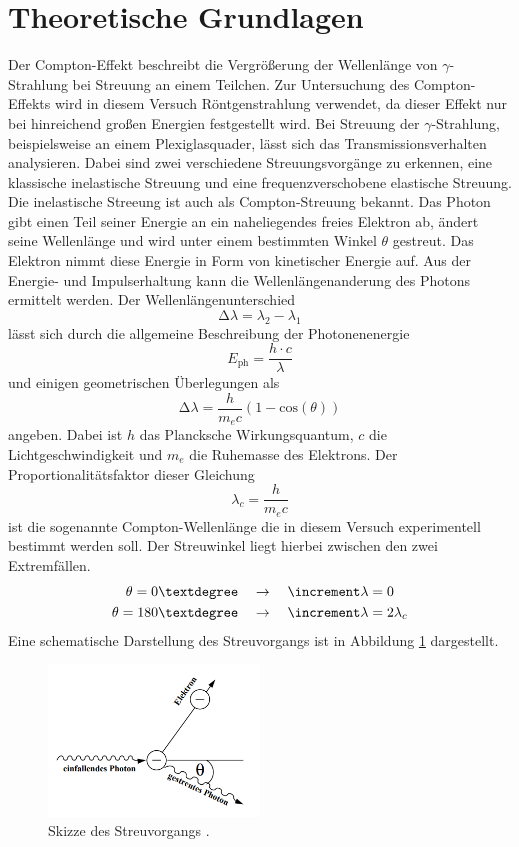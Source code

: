 \section{Theoretische Grundlagen}
Der Compton-Effekt beschreibt die Vergrößerung der Wellenlänge von $\gamma$-Strahlung bei Streuung an einem Teilchen. Zur Untersuchung
des Compton-Effekts wird in diesem Versuch Röntgenstrahlung verwendet, da dieser Effekt nur bei hinreichend großen Energien festgestellt wird.
Bei Streuung der $\gamma$-Strahlung, beispielsweise an einem Plexiglasquader, lässt sich das Transmissionsverhalten analysieren. Dabei
sind zwei verschiedene Streuungsvorgänge zu erkennen, eine klassische inelastische Streuung und eine frequenzverschobene elastische Streuung.
\\
Die inelastische Streeung ist auch als Compton-Streuung bekannt. Das Photon gibt einen Teil seiner Energie an ein naheliegendes freies Elektron ab, ändert seine Wellenlänge und wird unter einem 
bestimmten Winkel $\theta$ gestreut. Das Elektron nimmt diese Energie in Form von kinetischer Energie auf. Aus der Energie- und Impulserhaltung kann die Wellenlängenanderung des Photons ermittelt werden.
Der Wellenlängenunterschied
\begin{equation*}
\increment \lambda = \lambda_{2} - \lambda_{1}
\end{equation*}
lässt sich durch die allgemeine Beschreibung der Photonenenergie
\begin{equation*}
E_{\text{ph}} = \frac{h \cdot c}{\lambda}
\end{equation*}
und einigen geometrischen Überlegungen als
\begin{equation}
\increment \lambda = \frac{h}{m_{e} c}(1-\text{cos}(\theta))
\end{equation}
angeben. Dabei ist $h$ das Plancksche Wirkungsquantum, $c$ die Lichtgeschwindigkeit und $m_{e}$ die Ruhemasse des Elektrons.
Der Proportionalitätsfaktor dieser Gleichung
\begin{equation}
\lambda_{c} = \frac{h}{m_{e} c}
\end{equation}
ist die sogenannte Compton-Wellenlänge die in diesem Versuch experimentell bestimmt werden soll. Der Streuwinkel liegt hierbei zwischen den
zwei Extremfällen. 
\begin{align*}
\theta = 0\textdegree \quad &\to \quad \increment \lambda = 0 \\
\theta = 180\textdegree \quad &\to \quad \increment \lambda = 2 \lambda_{c}
\end{align*}
Eine schematische Darstellung des Streuvorgangs ist in Abbildung \ref{fig:comptonstreuungskizze} dargestellt.
\begin{figure}
  \centering
  \includegraphics[width=0.5\textwidth]{bilder/comptonstreuung.png}
  \caption{Skizze des Streuvorgangs \cite{skript3}.}
  \label{fig:comptonstreuungskizze}
\end{figure}